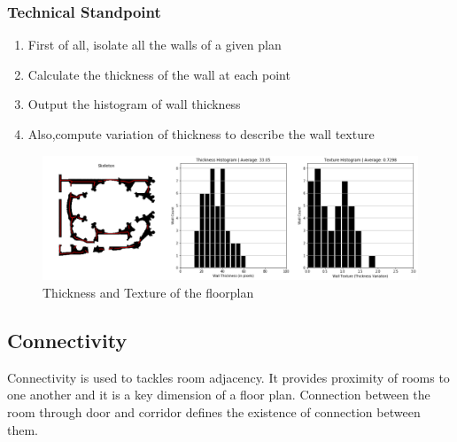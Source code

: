                         \subsubsection{Technical Standpoint}
                                \begin{enumerate}[label=\alph*.]
                                        \item First of all, isolate all the walls of a given plan
                                        \item Calculate the thickness of the wall at each point 
                                        \item Output the histogram of wall thickness
                                        \item Also,compute variation of thickness to describe the wall texture
                                \end{enumerate}
                        \pagebreak
                        \begin{figure}[h]
                                \centering
                                \includegraphics[width=1\textwidth]{img/chapter_6/thickness_texture.png}
                                \caption{Thickness and Texture of the floorplan}
                                \label{fig: Thickness and Texture of the floorplan}
                        \end{figure}
                
                \subsection{Connectivity}
                        Connectivity is used to tackles room adjacency. It provides proximity of rooms to one another and it is a key dimension of a floor plan. Connection between the room through door and corridor defines the existence of connection between them. 

